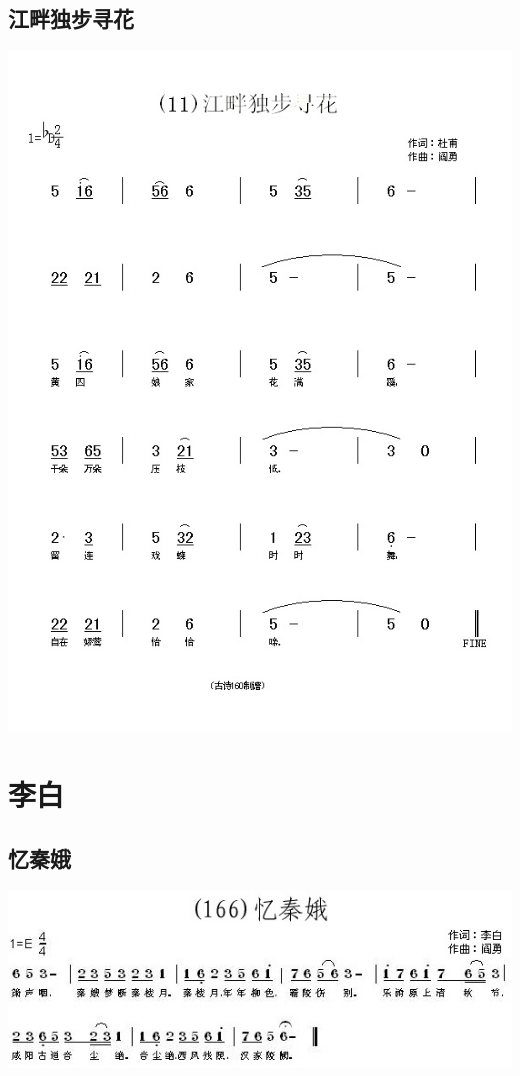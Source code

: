 \documentclass[cn,pad,twocol]{elegantbook}
\begin{document}
\section{江畔独步寻花}  \includegraphics[width=\textwidth]{dongxiao/20200808-江畔独步寻花-杜甫.jpg}   

\chapter{李白}
\section{忆秦娥}    \includegraphics[width=\textwidth]{dongxiao/20200808-忆秦娥-李白.jpg} 
\end{document}
